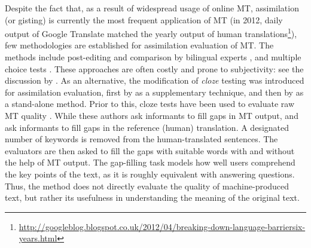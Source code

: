 \documentclass[11pt]{article}
\newcommand{\comment}[1]{}
\begin{document}
Despite the fact that, as a result of widespread usage of online MT, assimilation (or gisting) is currently the most frequent application of MT (in 2012, daily output of Google Translate matched the yearly output of human translations\footnote{\url{http://googleblog.blogspot.co.uk/2012/04/breaking-down-language-barriersix-years.html}}), few methodologies are established for assimilation evaluation of MT. The methods include post-editing and comparison by bilingual experts \citep{ginesti09},\comment{MLF: should we also cite the original WMT reference cited by Ginestí et al.?} and multiple choice tests \citep{jones07,trosterud12}. These approaches are often costly and prone to subjectivity: see the discussion by \cite{oregan13}. As an alternative, the modification of \emph{cloze}\comment{\emph{cloze} stands for \emph{closure}.} testing \citep{taylor53} was introduced for assimilation evaluation, first by \citet{trosterud12} as a supplementary technique, and then by \citet{oregan13} as a stand-alone method. Prior to this, cloze tests have been used to evaluate raw MT quality \citep{vanslype79,somers00}. While these authors ask informants to fill gaps in MT output, \citet{trosterud12} and \citet{oregan13} ask informants to fill gaps in the reference (human) translation. A designated number of keywords is removed from the human-translated sentences. The evaluators are then asked to fill the gaps with suitable words with and without the help of MT output. The gap-filling task models how well users comprehend the key points of the text, as it is roughly equivalent with answering questions. Thus, the method does not directly evaluate the quality of machine-produced text, but rather its usefulness in understanding the meaning of the original text. 
\end{document}
